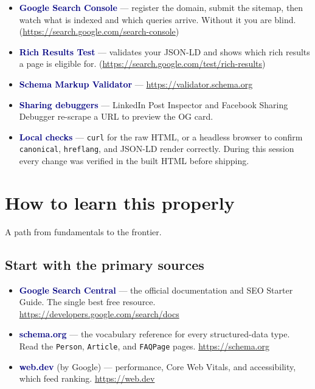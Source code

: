 \documentclass[11pt]{article}
\newcommand{\term}[1]{\textcolor{navy}{\textbf{#1}}}
\begin{document}
\begin{itemize}[leftmargin=1.4em]
  \item \term{Google Search Console} --- register the domain, submit the
  sitemap, then watch what is indexed and which queries arrive. Without it you
  are blind. (\url{https://search.google.com/search-console})
  \item \term{Rich Results Test} --- validates your JSON-LD and shows which rich
  results a page is eligible for.
  (\url{https://search.google.com/test/rich-results})
  \item \term{Schema Markup Validator} --- \url{https://validator.schema.org}
  \item \term{Sharing debuggers} --- LinkedIn Post Inspector and Facebook
  Sharing Debugger re-scrape a URL to preview the OG card.
  \item \term{Local checks} --- \texttt{curl} for the raw HTML, or a headless
  browser to confirm \texttt{canonical}, \texttt{hreflang}, and JSON-LD render
  correctly. During this session every change was verified in the built HTML
  before shipping.
\end{itemize}

\section{How to learn this properly}

A path from fundamentals to the frontier.

\subsection{Start with the primary sources}
\begin{itemize}[leftmargin=1.4em]
  \item \term{Google Search Central} --- the official documentation and SEO
  Starter Guide. The single best free resource.
  \url{https://developers.google.com/search/docs}
  \item \term{schema.org} --- the vocabulary reference for every structured-data
  type. Read the \texttt{Person}, \texttt{Article}, and \texttt{FAQPage} pages.
  \url{https://schema.org}
  \item \term{web.dev} (by Google) --- performance, Core Web Vitals, and
  accessibility, which feed ranking. \url{https://web.dev}
\end{itemize}
\end{document}
